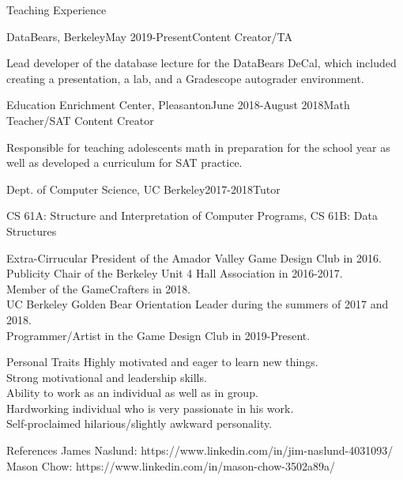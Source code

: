 \documentclass{resume} %
\begin{document}
\begin{rSection}{Teaching Experience} 
\begin{rSubsection}{DataBears, Berkeley}{May 2019-Present}{Content Creator/TA}{}
\item Lead developer of the database lecture for the DataBears DeCal, which included creating a presentation, a lab, and a Gradescope autograder environment.
\end{rSubsection}

\begin{rSubsection}{Education Enrichment Center, Pleasanton}{June 2018-August 2018}{Math Teacher/SAT Content Creator}{}
\item Responsible for teaching adolescents math in preparation for the school year as well as developed a curriculum for SAT practice.
\end{rSubsection}

\begin{rSubsection}{Dept. of Computer Science, UC Berkeley}{2017-2018}{Tutor}{}
\item CS 61A: Structure and Interpretation of Computer Programs, CS 61B: Data Structures
\end{rSubsection}
\end{rSection}

\newpage

\begin{rSection}{Extra-Cirrucular} \itemsep -3pt
President of the Amador Valley Game Design Club in 2016. \\
Publicity Chair of the Berkeley Unit 4 Hall Association in 2016-2017. \\
Member of the GameCrafters in 2018. \\
UC Berkeley Golden Bear Orientation Leader during the summers of 2017 and 2018. \\
Programmer/Artist in the Game Design Club in 2019-Present.
\end{rSection}

\begin{rSection}{Personal Traits}
Highly motivated and eager to learn new things. \\
Strong motivational and leadership skills. \\
Ability to work as an individual as well as in group. \\
Hardworking individual who is very passionate in his work. \\
Self-proclaimed hilarious/slightly awkward personality.
\end{rSection}

\begin{rSection}{References}
James Naslund: https://www.linkedin.com/in/jim-naslund-4031093/ \\
Mason Chow: https://www.linkedin.com/in/mason-chow-3502a89a/
\end{rSection}
\end{document}
